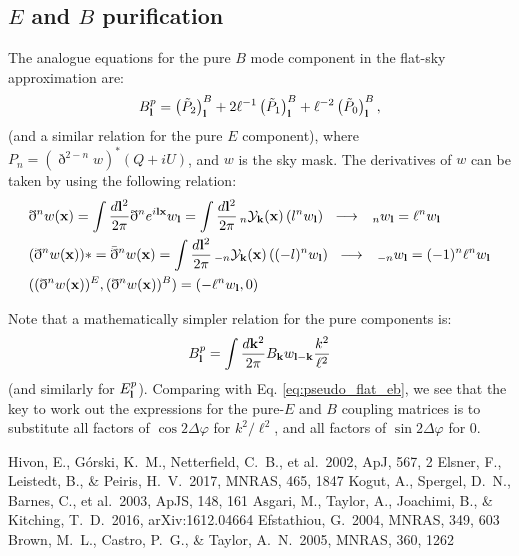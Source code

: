 \documentclass[a4paper,10pt]{article}
\newcommand{\apj}{ApJ}
\newcommand{\apjs}{ApJS}
\newcommand{\mnras}{MNRAS}
\begin{document}
  \subsection{$E$ and $B$ purification}
    The analogue equations for the pure $B$ mode component in the flat-sky approximation are:
    \begin{equation}
      B^p_{\bf l}=\left(\tilde{P}_2\right)^B_{\bf l}+2\ell^{-1}\left(\tilde{P}_1\right)^B_{\bf l}+\ell^{-2}\left(\tilde{P}_0\right)^B_{\bf l},
    \end{equation}
    (and a similar relation for the pure $E$ component), where $P_n=(\eth^{2-n}w)^*(Q+iU)$, and $w$ is the sky mask. The derivatives of $w$
    can be taken by using the following relation:
    \begin{align}
      &\eth^nw({\bf x})=\int\frac{d{\bf l}^2}{2\pi}\eth^ne^{i{\bf l}{\bf x}}w_{\bf l}=\int\frac{d{\bf l}^2}{2\pi}\,_n{\cal Y}_{\bf k}({\bf x})\,(l^nw_{\bf l})\hspace{6pt}
      \longrightarrow\hspace{6pt}\,_nw_{\bf l}=\ell^nw_{\bf l}\\
      &(\eth^nw({\bf x}))*=\bar{\eth}^nw({\bf x})=\int\frac{d{\bf l}^2}{2\pi}\,_{-n}{\cal Y}_{\bf k}({\bf x})\,((-l)^nw_{\bf l})\hspace{6pt}
      \longrightarrow\hspace{6pt}\,_{-n}w_{\bf l}=(-1)^n\ell^nw_{\bf l}\\
      &((\eth^nw({\bf x}))^E,(\eth^nw({\bf x}))^B)=(-\ell^nw_{\bf l},0)
    \end{align}
    
    Note that a mathematically simpler relation for the pure components is:
    \begin{equation}
      B^p_{\bf l}=\int\frac{d{\bf k}^2}{2\pi}B_{\bf k}w_{{\bf l}-{\bf k}}\frac{k^2}{\ell^2}
    \end{equation}
    (and similarly for $E^p_{\bf l}$). Comparing with Eq. \ref{eq:pseudo_flat_eb}, we see that the key to work out the expressions for the pure-$E$ and $B$ coupling matrices is to substitute all factors of $\cos2\Delta\varphi$ for $k^2/\ell^2$, and all factors of $\sin2\Delta\varphi$ for 0.
    
\begin{thebibliography}{}
  Hivon, E., G{\'o}rski, K.~M., Netterfield, C.~B., et al.\ 2002, \apj, 567, 2 
  Elsner, F., Leistedt, B., \& Peiris, H.~V.\ 2017, \mnras, 465, 1847 
  Kogut, A., Spergel, D.~N., Barnes, C., et al.\ 2003, \apjs, 148, 161 
  Asgari, M., Taylor, A., Joachimi, B., \& Kitching, T.~D.\ 2016, arXiv:1612.04664 
  Efstathiou, G.\ 2004, \mnras, 349, 603
  Brown, M.~L., Castro, P.~G., \& Taylor, A.~N.\ 2005, \mnras, 360, 1262 
\end{thebibliography}
\end{document}
